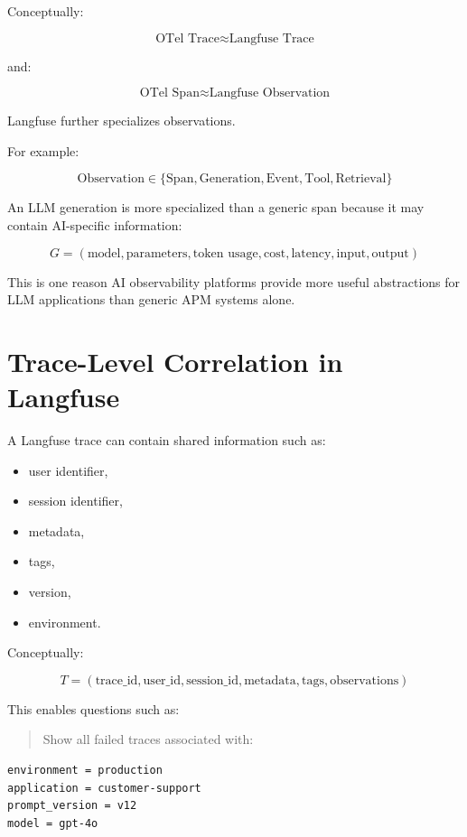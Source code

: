 \documentclass[11pt,a4paper]{article}
\begin{document}
Conceptually:

\[
\text{OTel Trace} \approx \text{Langfuse Trace}
\]

and:

\[
\text{OTel Span} \approx \text{Langfuse Observation}
\]

Langfuse further specializes observations.

For example:

\[
\text{Observation} \in \{ \text{Span}, \text{Generation}, \text{Event}, \text{Tool}, \text{Retrieval} \}
\]

An LLM generation is more specialized than a generic span because it may contain AI-specific information:

\[
G = ( \text{model}, \text{parameters}, \text{token usage}, \text{cost}, \text{latency}, \text{input}, \text{output} )
\]

This is one reason AI observability platforms provide more useful abstractions for LLM applications than generic APM systems alone.

\section{Trace-Level Correlation in Langfuse}

A Langfuse trace can contain shared information such as:

\begin{itemize}
\item user identifier,
\item session identifier,
\item metadata,
\item tags,
\item version,
\item environment.
\end{itemize}

Conceptually:

\[
T = ( \text{trace\_id}, \text{user\_id}, \text{session\_id}, \text{metadata}, \text{tags}, \text{observations} )
\]

This enables questions such as:

\begin{quote}
Show all failed traces associated with:
\end{quote}

\begin{lstlisting}
environment = production
application = customer-support
prompt_version = v12
model = gpt-4o
\end{lstlisting}
\end{document}
